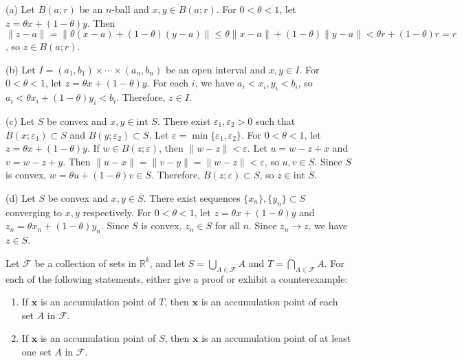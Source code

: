 (a) Let $B(a;r)$ be an $n$-ball and $x, y \in B(a;r)$. For $0 < \theta < 1$, let $z = \theta x + (1-\theta)y$. Then $\|z-a\| = \|\theta(x-a) + (1-\theta)(y-a)\| \leq \theta\|x-a\| + (1-\theta)\|y-a\| < \theta r + (1-\theta)r = r$, so $z \in B(a;r)$.

(b) Let $I = (a_1,b_1) \times \cdots \times (a_n,b_n)$ be an open interval and $x, y \in I$. For $0 < \theta < 1$, let $z = \theta x + (1-\theta)y$. For each $i$, we have $a_i < x_i, y_i < b_i$, so $a_i < \theta x_i + (1-\theta)y_i < b_i$. Therefore, $z \in I$.

(c) Let $S$ be convex and $x, y \in \text{int } S$. There exist $\varepsilon_1, \varepsilon_2 > 0$ such that $B(x;\varepsilon_1) \subset S$ and $B(y;\varepsilon_2) \subset S$. Let $\varepsilon = \min\{\varepsilon_1, \varepsilon_2\}$. For $0 < \theta < 1$, let $z = \theta x + (1-\theta)y$. If $w \in B(z;\varepsilon)$, then $\|w-z\| < \varepsilon$. Let $u = w - z + x$ and $v = w - z + y$. Then $\|u-x\| = \|v-y\| = \|w-z\| < \varepsilon$, so $u, v \in S$. Since $S$ is convex, $w = \theta u + (1-\theta)v \in S$. Therefore, $B(z;\varepsilon) \subset S$, so $z \in \text{int } S$.

(d) Let $S$ be convex and $x, y \in \overline{S}$. There exist sequences $\{x_n\}, \{y_n\} \subset S$ converging to $x, y$ respectively. For $0 < \theta < 1$, let $z = \theta x + (1-\theta)y$ and $z_n = \theta x_n + (1-\theta)y_n$. Since $S$ is convex, $z_n \in S$ for all $n$. Since $z_n \to z$, we have $z \in \overline{S}$.

\begin{problembox}            
Let $\mathcal{F}$ be a collection of sets in $\mathbb{R}^k$, and let $S = \bigcup_{A \in \mathcal{F}} A$ and $T = \bigcap_{A \in \mathcal{F}} A$. For each of the following statements, either give a proof or exhibit a counterexample:
\begin{enumerate}[label=\alph*)]
\item If $\mathbf{x}$ is an accumulation point of $T$, then $\mathbf{x}$ is an accumulation point of each set $A$ in $\mathcal{F}$.
\item If $\mathbf{x}$ is an accumulation point of $S$, then $\mathbf{x}$ is an accumulation point of at least one set $A$ in $\mathcal{F}$.
\end{enumerate}
\end{problembox}

